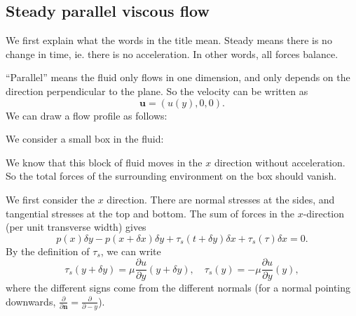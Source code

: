 \documentclass[a4paper]{article}
\begin{document}
\subsection{Steady parallel viscous flow}
We first explain what the words in the title mean. Steady means there is no change in time, ie. there is no acceleration. In other words, all forces balance.

``Parallel'' means the fluid only flows in one dimension, and only depends on the direction perpendicular to the plane. So the velocity can be written as
\[
  \mathbf{u} = (u(y), 0, 0).
\]
We can draw a flow profile as follows:
\begin{center}
\end{center}
We consider a small box in the fluid:
\begin{center}
\end{center}
We know that this block of fluid moves in the $x$ direction without acceleration. So the total forces of the surrounding environment on the box should vanish.

We first consider the $x$ direction. There are normal stresses at the sides, and tangential stresses at the top and bottom. The sum of forces in the $x$-direction (per unit transverse width) gives
\[
  p(x) \delta y - p(x + \delta x) \delta y + \tau_s(t + \delta y) \delta x + \tau_s(\tau) \delta x = 0.
\]
By the definition of $\tau_s$, we can write
\[
  \tau_s(y + \delta y) = \mu \frac{\partial u}{\partial y}(y + \delta y),\quad \tau_s (y) = -\mu \frac{\partial u}{\partial y}(y),
\]
where the different signs come from the different normals (for a normal pointing downwards, $\frac{\partial}{\partial \mathbf{n}} = \frac{\partial}{\partial -y}$).
\end{document}
